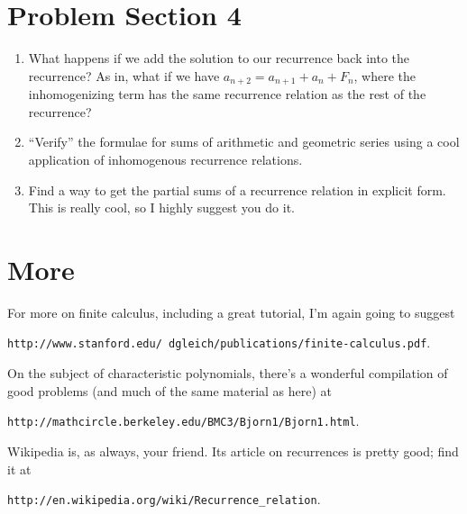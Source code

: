 \documentclass[12pt,letterpaper]{article}
\begin{document}
\section{Problem Section 4}
\begin{enumerate}
\item What happens if we add the solution to our recurrence back into the
recurrence? As in, what if we have $a_{n+2} = a_{n+1} + a_n + F_n$, where the
inhomogenizing term has the same recurrence relation as the rest of the recurrence?
\item ``Verify'' the formulae for sums of arithmetic and geometric series using
a cool application of inhomogenous recurrence relations.
\item Find a way to get the partial sums of a recurrence relation in explicit
form. This is really cool, so I highly suggest you do it.
\end{enumerate}

\section{More}
For more on finite calculus, including a great tutorial, I'm again going to suggest
\begin{center}\texttt{http://www.stanford.edu/\string~dgleich/publications/finite-calculus.pdf}.\end{center}

On the subject of characteristic polynomials, there's a wonderful
compilation of good problems (and much of the same material as here)
at
\begin{center}\texttt{http://mathcircle.berkeley.edu/BMC3/Bjorn1/Bjorn1.html}.\end{center}

Wikipedia is, as always, your friend. Its article on recurrences
is pretty good; find it at
\begin{center}\texttt{http://en.wikipedia.org/wiki/Recurrence\string_relation}.\end{center}
\end{document}
